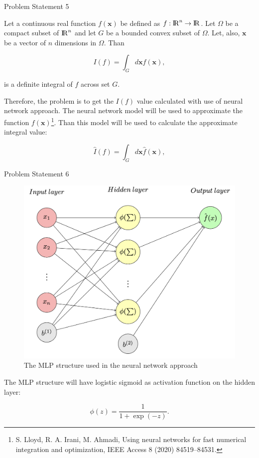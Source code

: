 \documentclass[9pt]{beamer}
\begin{document}
\begin{frame}{Problem Statement 5}

Let a continuous real function $f(\mathbf{x})$ be defined as $f: {\rm I\!R}^n \to {\rm I\!R}$. Let $\Omega$ be a compact subset of ${\rm I\!R}^n$ and let $G$ be a bounded convex subset of $\Omega$. Let, also, $\mathbf{x}$ be a vector of $n$ dimensions in $\Omega$. Than

\begin{equation}
    \label{eq: integral definition}
    I(f) = \int_G d\mathbf{x} f(\mathbf{x}),
\end{equation}

\noindent is a definite integral of $f$ across set $G$. 

Therefore, the problem is to get the $I(f)$ value calculated with use of neural network approach. The neural network model will be used to approximate the function $f(\mathbf{x})$\footnote{S. Lloyd, R. A. Irani, M. Ahmadi, Using neural networks for fast numerical integration and
optimization, IEEE Access 8 (2020) 84519–84531.}. Than this model will be used to calculate the approximate integral value:

\begin{equation}
    \label{eq: integral definition}
    \hat{I}(f) = \int_G d\mathbf{x} \hat{f}(\mathbf{x}),
\end{equation}

\end{frame}

\begin{frame}{Problem Statement 6}

\begin{figure}[h!]
    \centering
    \includegraphics[width=0.4\linewidth]{structre-as-photo.png}
    \caption{The MLP structure used in the neural network approach}
    \label{fig:structure}
\end{figure}

The MLP structure will have logistic sigmoid as activation function on the hidden layer:

\begin{equation}
    \label{eq:sigmoid}
    \phi(z) = \frac{1}{1+\exp(-z)}.
\end{equation}

\end{frame}
\end{document}
